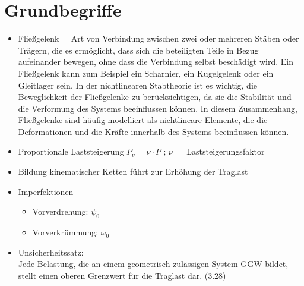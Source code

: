 \documentclass[fleqn,twoside]{article}
\title{\Huge{\textfrak{Nichtlineare Modellierung von Stabtragwerken}}}
\author{\calligra{Jonas Konrad}}
\date{\textfrak{\today}}
\begin{document}
\parindent 0pt
\fancyfoot[R]{\frakfamily }
\maketitle \thispagestyle{empty}
\begin{center}
\end{center}
\tableofcontents
\newpage

\section{Grundbegriffe}
\begin{itemize}
    \item Fließgelenk = Art von Verbindung zwischen zwei oder mehreren Stäben oder Trägern, die es ermöglicht, dass sich die beteiligten Teile in Bezug aufeinander bewegen, ohne dass die Verbindung selbst beschädigt wird. Ein Fließgelenk kann zum Beispiel ein Scharnier, ein Kugelgelenk oder ein Gleitlager sein. In der nichtlinearen Stabtheorie ist es wichtig, die Beweglichkeit der Fließgelenke zu berücksichtigen, da sie die Stabilität und die Verformung des Systems beeinflussen können. In diesem Zusammenhang, Fließgelenke sind häufig modelliert als nichtlineare Elemente, die die Deformationen und die Kräfte innerhalb des Systems beeinflussen können.
    \item Proportionale Laststeigerung $P_\nu = \nu \cdot P$ ; $\nu =$ Laststeigerungsfaktor
    \item Bildung kinematischer Ketten führt zur Erhöhung der Traglast
    \item Imperfektionen
        \begin{itemize}
            \item Vorverdrehung: $\psi_0$
            \item Vorverkrümmung: $\omega_0$
        \end{itemize}
    \item Unsicherheitssatz: \\ Jede Belastung, die an einem geometrisch zulässigen System GGW bildet, stellt einen oberen Grenzwert für die Traglast dar. (3.28)
\end{itemize}
\end{document}
